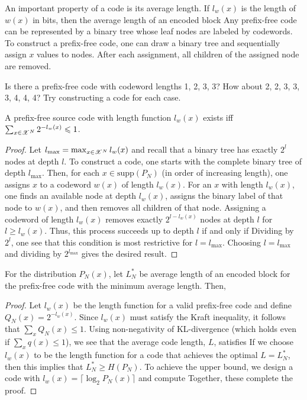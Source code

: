 \documentclass[letterpaper,10pt,english]{article}
\begin{document}
An important property of a code is its average length. 
If $l_w(x)$ is the length of $w(x)$ in bits, then the average length of an encoded block 
Any prefix-free code can be represented by a binary tree whose leaf nodes are labeled by codewords. 
To construct a prefix-free code, one can draw a binary tree and sequentially assign $x$ values to nodes. 
After each assignment, all children of the assigned node are removed.
\begin{exerc} 
Is there a prefix-free code with codeword lengths 1, 2, 3, 3? How about 2, 2, 3, 3, 3, 4, 4, 4? 
Try constructing a code for each case.
\end{exerc}
\begin{lem}  
A prefix-free source code with length function $l_w(x)$ exists iff $\sum_{x \in \mathscr{X}^N}2^{-l_w(x)} \leqslant 1$. 
\end{lem} 
\begin{proof}
Let $l_{\max} = \max_{x \in \mathscr{X}^N} l_w(x)$ and recall that a binary tree has exactly $2^l$ nodes at depth $l$. 
To construct a code, one starts with the complete binary tree of depth $l_{\max}$. 
Then, for each $x \in \text{supp}(P_N)$ (in order of increasing length), one assigns $x$ to a codeword $w(x)$ of length $l_w(x)$. 
For an $x$ with length $l_w(x)$, one finds an available node at depth $l_w(x)$, assigns the binary label of that node to $w(x)$, 
and then removes all children of that node. 
Assigning a codeword of length $l_w(x)$ removes exactly $2^{l-l_w(x)}$ nodes at depth $l$ for $l \ge l_w(x)$. 
Thus, this process succeeds up to depth $l$ if and only if 
Dividing by $2^l$, one see that this condition is most restrictive for $l = l_{\max}$. 
Choosing $l = l_{\max}$ and dividing by $2^{l_{\max}}$ gives the desired result.
\end{proof}
\begin{thm} 
For the distribution $P_N(x)$, let $L_N^{\ast}$ be average length of an encoded block for the prefix-free code with the minimum average length. 
Then,
\end{thm} 
\begin{proof} 
Let $l_w(x)$ be the length function for a valid prefix-free code and define $Q_N(x) = 2^{-l_w(x)}$. 
Since $l_w(x)$ must satisfy the Kraft inequality, it follows that $\sum_x Q_N(x) \le 1$. 
Using non-negativity of KL-divergence (which holds even if $\sum_x q(x) \le 1$), 
we see that the average code length, $L$, satisfies
If we choose $l_w(x)$ to be the length function for a code that achieves the optimal $L = L^{\ast}_N$, then this implies that $L^{\ast}_N \ge H (P_N)$. 
To achieve the upper bound, we design a code with $l_w (x) = \lceil \log_2 P_N (x)\rceil$ and compute
Together, these complete the proof.
\end{proof} 
\end{document}
